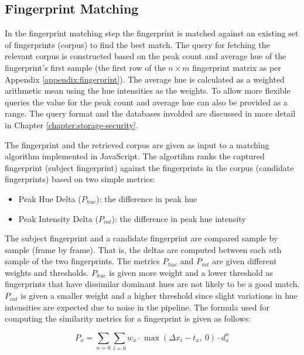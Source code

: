 \documentclass[thesis.tex]{subfiles}
\begin{document}
\subsection{Fingerprint Matching}
\label{chapter:fingerprint-matching}

In the fingerprint matching step the fingerprint is matched against an existing set of fingerprints (corpus) to find the best match. The query for fetching the relevant corpus is constructed based on the peak count and average hue of the fingerprint's first sample (the first row of the $n \times m$ fingerprint matrix as per Appendix \ref{appendix:fingerprint}). The average hue is calculated as a weighted arithmetic mean using the hue intensities as the weights. To allow more flexible queries the value for the peak count and average hue can also be provided as a range. The query format and the databases involded are discussed in more detail in Chapter \ref{chapter:storage-security}.

The fingerprint and the retrieved corpus are given as input to a matching algorithm implemented in JavaScript. The algortihm ranks the captured fingerprint (subject fingerprint) against the fingerprints in the corpus (candidate fingerprints) based on two simple metrics:

\begin{itemize}
	\item Peak Hue Delta ($P_{hue}$): the difference in peak hue
	\item Peak Intensity Delta ($P_{int}$): the difference in peak hue intensity
\end{itemize}

The subject fingerprint and a candidate fingerprint are compared sample by sample (frame by frame). That is, the deltas are computed between each $n$th sample of the two fingerprints. The metrics $P_{hue}$ and $P_{int}$ are given different weights and thresholds. $P_{hue}$ is given more weight and a lower threshold as fingerprints that have dissimilar dominant hues are not likely to be a good match. $P_{int}$ is given a smaller weight and a higher threshold since slight variations in hue intensities are expected due to noise in the pipeline. The formula used for computing the similarity metrics for a fingerprint is given as follows:

\begin{equation}
\label{equation:similarity-metric}
	P_x = \sum \limits_{n=0} \sum \limits_{i=0} { { w_x \cdot \max (\Delta{x_i}-t_x,\ 0) \cdot d_x^n } }
\end{equation}
\end{document}
